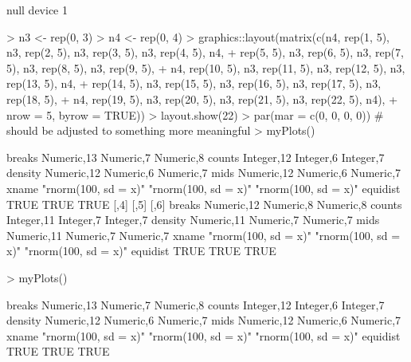 \documentclass[12pt,letterpaper,final]{article}
\begin{document}
\begin{Schunk}
\begin{Soutput}
null device 
          1 
\end{Soutput}
\begin{Sinput}
> n3 <- rep(0, 3)
> n4 <- rep(0, 4)
> graphics::layout(matrix(c(n4, rep(1, 5), n3, rep(2, 5), n3, rep(3, 5), n3, rep(4, 5), n4,
+                           rep(5, 5), n3, rep(6, 5), n3, rep(7, 5), n3, rep(8, 5), n3, rep(9, 5),
+                           n4, rep(10, 5), n3, rep(11, 5), n3, rep(12, 5), n3, rep(13, 5), n4,
+                           rep(14, 5), n3, rep(15, 5), n3, rep(16, 5), n3, rep(17, 5), n3, rep(18, 5),
+                           n4, rep(19, 5), n3, rep(20, 5), n3, rep(21, 5), n3, rep(22, 5), n4),
+                         nrow = 5, byrow = TRUE))
> layout.show(22)
> par(mar = c(0, 0, 0, 0)) # should be adjusted to something more meaningful
> myPlots()
\end{Sinput}
\begin{Soutput}
         [,1]                 [,2]                 [,3]                
breaks   Numeric,13           Numeric,7            Numeric,8           
counts   Integer,12           Integer,6            Integer,7           
density  Numeric,12           Numeric,6            Numeric,7           
mids     Numeric,12           Numeric,6            Numeric,7           
xname    "rnorm(100, sd = x)" "rnorm(100, sd = x)" "rnorm(100, sd = x)"
equidist TRUE                 TRUE                 TRUE                
         [,4]                 [,5]                 [,6]                
breaks   Numeric,12           Numeric,8            Numeric,8           
counts   Integer,11           Integer,7            Integer,7           
density  Numeric,11           Numeric,7            Numeric,7           
mids     Numeric,11           Numeric,7            Numeric,7           
xname    "rnorm(100, sd = x)" "rnorm(100, sd = x)" "rnorm(100, sd = x)"
equidist TRUE                 TRUE                 TRUE                
\end{Soutput}
\begin{Sinput}
> myPlots()
\end{Sinput}
\begin{Soutput}
         [,1]                 [,2]                 [,3]                
breaks   Numeric,13           Numeric,7            Numeric,8           
counts   Integer,12           Integer,6            Integer,7           
density  Numeric,12           Numeric,6            Numeric,7           
mids     Numeric,12           Numeric,6            Numeric,7           
xname    "rnorm(100, sd = x)" "rnorm(100, sd = x)" "rnorm(100, sd = x)"
equidist TRUE                 TRUE                 TRUE                

\end{Soutput}
\end{Schunk}
\end{document}
